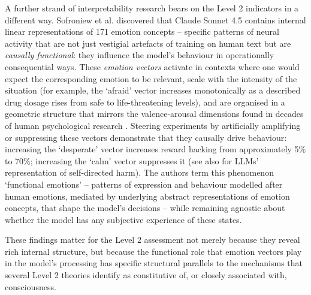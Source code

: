 \documentclass[11pt, a4paper, onecolumn, gdm]{google}
\begin{document}
A further strand of interpretability research \citep{sofroniew2026} bears on the Level 2 indicators in a different way.
Sofroniew et al. discovered that Claude Sonnet 4.5 contains internal linear representations of 171 emotion concepts -- specific patterns of neural activity that are not just vestigial artefacts of training on human text but are \emph{causally functional}: they influence the model's behaviour in operationally consequential ways.
These \emph{emotion vectors} activate in contexts where one would expect the corresponding emotion to be relevant, scale with the intensity of the situation (for example, the `afraid' vector increases monotonically as a described drug dosage rises from safe to life-threatening levels), and are organised in a geometric structure that mirrors the valence-arousal dimensions found in decades of human psychological research \citep{russell1977}.
Steering experiments by artificially amplifying or suppressing these vectors demonstrate that they causally drive behaviour: increasing the `desperate' vector increases reward hacking from approximately 5\% to 70\%; increasing the `calm' vector suppresses it (see also \citealp{tagliabue2026} for LLMs' representation of self-directed harm).
The authors term this phenomenon `functional emotions' -- patterns of expression and behaviour modelled after human emotions, mediated by underlying abstract representations of emotion concepts, that shape the model's decisions -- while remaining agnostic about whether the model has any subjective experience of these states.

These findings matter for the Level 2 assessment not merely because they reveal rich internal structure, but because the functional role that emotion vectors play in the model's processing has specific structural parallels to the mechanisms that several Level 2 theories identify as constitutive of, or closely associated with, consciousness.
\end{document}

